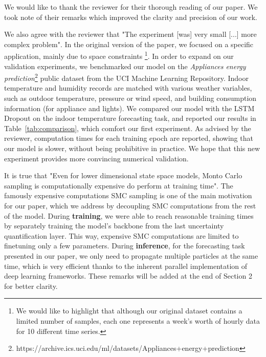 \documentclass{article}
\title{}
\author{}
\date{}
\begin{document}
\maketitle

We would like to thank the reviewer for their thorough reading of our paper.
We took note of their remarks which improved the clarity and precision of our work.

We also agree with the reviewer that "The experiment [was] very small [...] more complex problem".
In the original version of the paper, we focused on a specific application,  mainly due to space constraints \footnote{We would like to highlight that although our original dataset contains a limited number of samples, each one represents a week's worth of hourly data for 10 different time series.}.
In order to expand on our validation experiments, we benchmarked our model on the \textit{Appliances energy prediction}\footnote{https://archive.ics.uci.edu/ml/datasets/Appliances+energy+prediction} public dataset from the UCI Machine Learning Repository.
Indoor temperature and humidity records are matched with various weather variables, such as outdoor temperature, pressure or wind speed, and building consumption information (for appliance and lights).
We compared our model with the LSTM Dropout on the indoor temperature forecasting task, and reported our results in Table~\ref{tab:comparison}, which comfort our first experiment.
As advised by the reviewer, computation times for each training epoch are reported, showing that our model is slower, without being prohibitive in practice.
We  hope that this new experiment provides more convincing numerical validation.

It is true that "Even for lower dimensional state space models, Monto Carlo sampling is computationally expensive do perform at training time".
The famously expensive computations SMC sampling is one of the main motivation for our paper, which we address by decoupling SMC computations from the rest of the model. During \textbf{training}, we were able to reach reasonable training times by separately training the model's backbone from the last uncertainty quantification layer.
	      This way, expensive SMC computations are limited to finetuning only a few parameters.
During {\bf inference}, for the forecasting task presented in our paper, we only need to propagate multiple particles at the same time, which is very efficient thanks to the inherent parallel implementation of deep learning frameworks.
These remarks will be added at the end of Section 2 for better clarity.
\end{document}
